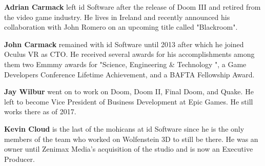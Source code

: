 \textbf{Adrian Carmack} left id Software after the release of Doom III and retired from the video game industry. He lives in Ireland and recently announced his collaboration with John Romero on an upcoming title called "Blackroom".\\
\par

\textbf{John Carmack} remained with id Software until 2013 after which he joined Oculus VR as CTO. He received several awards for his accomplishments among them two Emmmy awards for "Science, Engineering \& Technology ", a Game Developers Conference Lifetime Achievement, and a BAFTA Fellowship Award.\\
\par
\textbf{Jay Wilbur} went on to work on Doom, Doom II, Final Doom, and Quake. He left to become Vice President of Business Development at Epic Games. He still works there as of 2017.\\
\par
\textbf{Kevin Cloud} is the last of the mohicans at id Software since he is the only members of the team who worked on Wolfenstein 3D to still be there. He was an owner until Zenimax Media's acquisition of the studio and is now an Executive Producer.
\par